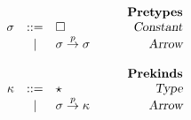 \begin{figure}

\begin{center}
\begin{math}
\begin{array}{rclr}
&&&\qquad\textsl{\bf Pretypes}\\
\sigma

&::=& 
\square
&\qquad\textsl{Constant} 
\\

&|& 
\sigma \stackrel{p}{\rightarrow} \sigma
&\qquad\textsl{Arrow}
\\
\\
&&&\qquad\textsl{\bf Prekinds}\\
\kappa

&::=& 
\star
&\qquad\textsl{Type} 
\\

&|& 
\sigma \stackrel{p}{\rightarrow} \kappa
&\qquad\textsl{Arrow}
\\
\end{array}
\end{math}
\end{center}
\end{figure}
